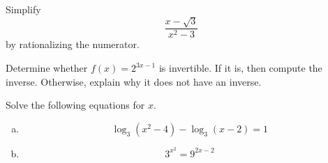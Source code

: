 \documentclass[12pt]{amsart}
\begin{document}
\begin{thm}[5 Points]
	Simplify 
	$$\frac{x - \sqrt{3}}{x^2 - 3}$$
	by rationalizing the numerator.
	\vspace{3in}
\end{thm}

\newpage

\begin{thm}[5 Points]\label{ex4}
  Determine whether $f(x) = 2^{3x - 1}$ is invertible.
  If it is, then compute the inverse.  
  Otherwise, explain why it does not have an inverse.
\end{thm}

\newpage

\begin{thm}[15 Points]\label{ex5}
  Solve the following equations for $x$.
  \begin{enumerate}[(a)]
  \item
    $$\log_3(x^2 - 4) - \log_3(x - 2) = 1$$
    \vspace{3.5in}
  \item
    $$3^{x^2} = 9^{2x - 2}$$
  \end{enumerate}
\end{thm}
\end{document}
